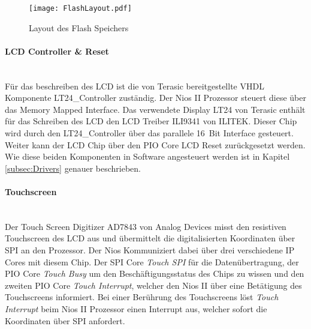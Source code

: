 \begin{figure}[h!]
	\centering
	\texttt{[image: FlashLayout.pdf]}
	\caption{Layout des Flash Speichers} 
	\label{img:FlashLayout}
\end{figure}  

\paragraph{LCD Controller \& Reset}\mbox{}\\

Für das beschreiben des LCD ist die von Terasic bereitgestellte VHDL Komponente LT24\_Controller zuständig. Der Nios II Prozessor steuert diese über das Memory Mapped Interface. Das verwendete Display LT24 von Terasic enthält für das Schreiben des LCD den LCD Treiber ILI9341 von ILITEK. Dieser Chip wird durch den LT24\_Controller über das parallele \SI{16}{Bit} Interface gesteuert. Weiter kann der LCD Chip über den PIO Core LCD Reset zurückgesetzt werden. Wie diese beiden Komponenten in Software angesteuert werden ist in Kapitel \ref{subsec:Drivers} genauer beschrieben. \cite{LCD_Chip}

\newpage

\paragraph{Touchscreen}\mbox{}\\

Der Touch Screen Digitizer AD7843 von Analog Devices misst den resistiven Touchscreen des LCD aus und übermittelt die digitalisierten Koordinaten über SPI an den Prozessor. Der Nios Kommuniziert dabei über drei verschiedene IP Cores mit diesem Chip. Der SPI Core \textit{Touch SPI} für die Datenübertragung, der PIO Core \textit{Touch Busy} um den Beschäftigungsstatus des Chips zu wissen und den zweiten PIO Core \textit{Touch Interrupt}, welcher den Nios II über eine Betätigung des Touchscreens informiert. Bei einer Berührung des Touchscreens löst \textit{Touch Interrupt} beim Nios II Prozessor einen Interrupt aus, welcher sofort die Koordinaten über SPI anfordert. \cite{Touch_ADC}